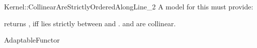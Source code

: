 \begin{ccRefFunctionObjectConcept}{Kernel::CollinearAreStrictlyOrderedAlongLine_2}
A model for this must provide:


         {returns , iff  lies strictly between 
          and . \ccPrecond {} and 
          are collinear.}

\ccRefines
AdaptableFunctor

\ccSeeAlso
{}  \\

\end{ccRefFunctionObjectConcept}
